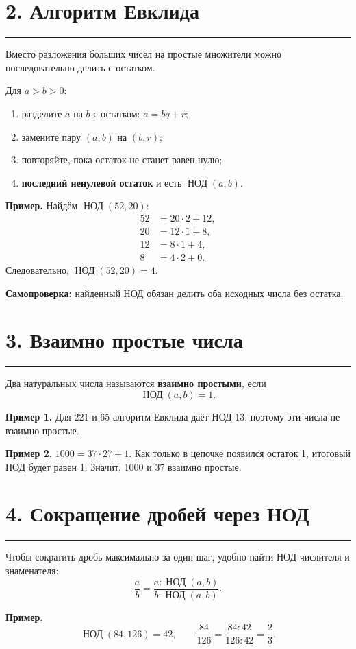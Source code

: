 \documentclass[a4paper,12pt]{article}
\newcommand{\nodr}{\mathop{\text{НОД}}\nolimits}
\newcommand{\key}[1]{\textcolor{darkaccent}{\textbf{#1}}}
\newcommand{\sectionrule}{\vspace{-2mm}\par\noindent\textcolor{linegray}{\rule{\linewidth}{0.5pt}}\par\vspace{1mm}}
\begin{document}
\section*{2. Алгоритм Евклида}
\sectionrule
Вместо разложения больших чисел на простые множители можно последовательно делить с остатком.

Для $a>b>0$:
\begin{enumerate}
  \item разделите $a$ на $b$ с остатком: $a=bq+r$;
  \item замените пару $(a,b)$ на $(b,r)$;
  \item повторяйте, пока остаток не станет равен нулю;
  \item \key{последний ненулевой остаток} и есть $\nodr(a,b)$.
\end{enumerate}

\textbf{Пример.} Найдём $\nodr(52,20)$:
\[
\begin{aligned}
52&=20\cdot2+12,\\
20&=12\cdot1+8,\\
12&=8\cdot1+4,\\
8&=4\cdot2+0.
\end{aligned}
\]
Следовательно, $\nodr(52,20)=4$.

\textbf{Самопроверка:} найденный НОД обязан делить оба исходных числа без остатка.

\section*{3. Взаимно простые числа}
\sectionrule
Два натуральных числа называются \key{взаимно простыми}, если
\[
\nodr(a,b)=1.
\]

\textbf{Пример 1.} Для 221 и 65 алгоритм Евклида даёт НОД 13, поэтому эти числа не взаимно простые.

\textbf{Пример 2.} $1000=37\cdot27+1$. Как только в цепочке появился остаток 1, итоговый НОД будет равен 1. Значит, 1000 и 37 взаимно простые.

\section*{4. Сокращение дробей через НОД}
\sectionrule
Чтобы сократить дробь максимально за один шаг, удобно найти НОД числителя и знаменателя:
\[
\frac{a}{b}=\frac{a:\nodr(a,b)}{b:\nodr(a,b)}.
\]

\textbf{Пример.}
\[
\nodr(84,126)=42,
\qquad
\frac{84}{126}=\frac{84:42}{126:42}=\frac{2}{3}.
\]
\end{document}
